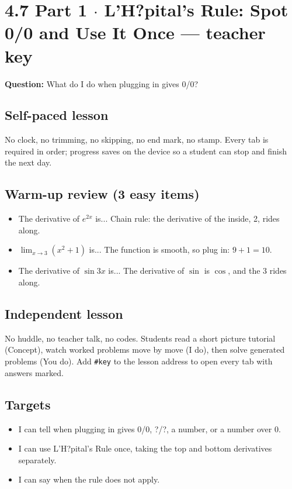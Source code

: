 \documentclass[11pt]{article}
\begin{document}
\section*{4.7 Part 1 $\cdot$ L'H?pital's Rule: Spot 0/0 and Use It Once --- teacher key}
\textbf{Question:} What do I do when plugging in gives 0/0?\par
\subsection*{Self-paced lesson}No clock, no trimming, no skipping, no end mark, no stamp. Every tab is required in order; progress saves on the device so a student can stop and finish the next day.\par
\subsection*{Warm-up review (3 easy items)}\begin{itemize}
\item The derivative of $e^{2x}$ is...  Chain rule: the derivative of the inside, 2, rides along.
\item $\displaystyle\lim_{x\to3}(x^2+1)$ is...  The function is smooth, so plug in: $9+1=10$.
\item The derivative of $\sin 3x$ is...  The derivative of $\sin$ is $\cos$, and the 3 rides along.
\end{itemize}
\subsection*{Independent lesson}No huddle, no teacher talk, no codes. Students read a short picture tutorial (Concept), watch worked problems move by move (I do), then solve generated problems (You do). Add \texttt{\#key} to the lesson address to open every tab with answers marked.\par
\subsection*{Targets}\begin{itemize}\item I can tell when plugging in gives 0/0, ?/?, a number, or a number over 0.
\item I can use L'H?pital's Rule once, taking the top and bottom derivatives separately.
\item I can say when the rule does not apply.\end{itemize}
\end{document}
